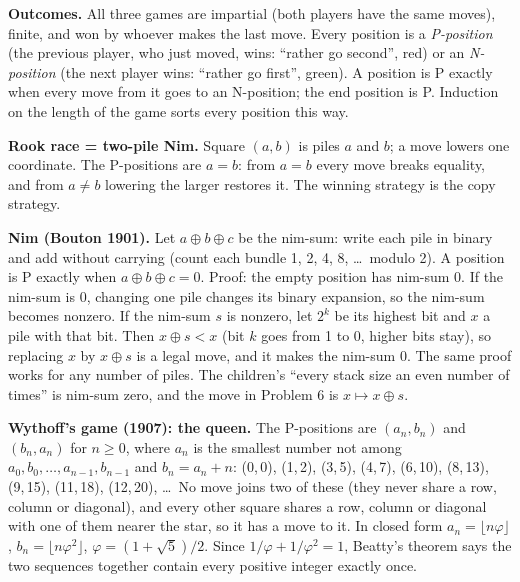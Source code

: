 \documentclass[10pt]{article}
\begin{document}
\textbf{Outcomes.} All three games are impartial (both players have the same moves), finite, and won by whoever makes the last move. Every position is a \emph{P-position} (the previous player, who just moved, wins: ``rather go second'', red) or an \emph{N-position} (the next player wins: ``rather go first'', green). A position is P exactly when every move from it goes to an N-position; the end position is P. Induction on the length of the game sorts every position this way.

\textbf{Rook race = two-pile Nim.} Square \((a,b)\) is piles \(a\) and \(b\); a move lowers one coordinate. The P-positions are \(a=b\): from \(a=b\) every move breaks equality, and from \(a\neq b\) lowering the larger restores it. The winning strategy is the copy strategy.

\textbf{Nim (Bouton 1901).} Let \(a\oplus b\oplus c\) be the nim-sum: write each pile in binary and add without carrying (count each bundle 1, 2, 4, 8, \dots\ modulo 2). A position is P exactly when \(a\oplus b\oplus c=0\). Proof: the empty position has nim-sum 0. If the nim-sum is 0, changing one pile changes its binary expansion, so the nim-sum becomes nonzero. If the nim-sum \(s\) is nonzero, let \(2^k\) be its highest bit and \(x\) a pile with that bit. Then \(x\oplus s<x\) (bit \(k\) goes from 1 to 0, higher bits stay), so replacing \(x\) by \(x\oplus s\) is a legal move, and it makes the nim-sum 0. The same proof works for any number of piles. The children's ``every stack size an even number of times'' is nim-sum zero, and the move in Problem 6 is \(x\mapsto x\oplus s\).

\textbf{Wythoff's game (1907): the queen.} The P-positions are \((a_n,b_n)\) and \((b_n,a_n)\) for \(n\ge 0\), where \(a_n\) is the smallest number not among \(a_0,b_0,\dots,a_{n-1},b_{n-1}\) and \(b_n=a_n+n\): (0,\,0), (1,\,2), (3,\,5), (4,\,7), (6,\,10), (8,\,13), (9,\,15), (11,\,18), (12,\,20), \dots\ No move joins two of these (they never share a row, column or diagonal), and every other square shares a row, column or diagonal with one of them nearer the star, so it has a move to it. In closed form \(a_n=\lfloor n\varphi\rfloor\), \(b_n=\lfloor n\varphi^2\rfloor\), \(\varphi=(1+\sqrt5)/2\). Since \(1/\varphi+1/\varphi^2=1\), Beatty's theorem says the two sequences together contain every positive integer exactly once.
\end{document}

